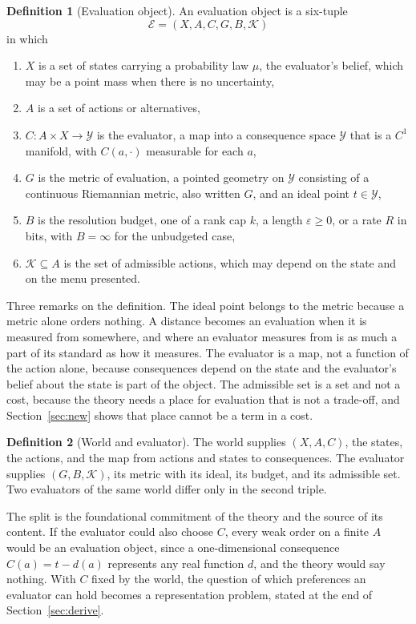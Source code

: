 \documentclass[11pt]{article}
\theoremstyle{definition}
\newtheorem{definition}{Definition}
\theoremstyle{remark}
\newcommand{\Ev}{\mathcal{E}}
\newcommand{\K}{\mathcal{K}}
\newcommand{\Y}{\mathcal{Y}}
\begin{document}
\begin{definition}[Evaluation object]
\label{def:object}
An evaluation object is a six-tuple
\[
\Ev=(X,A,C,G,B,\K)
\]
in which
\begin{enumerate}
\item[(i)] $X$ is a set of states carrying a probability law $\mu$, the evaluator's belief, which may be a point mass when there is no uncertainty,
\item[(ii)] $A$ is a set of actions or alternatives,
\item[(iii)] $C:A\times X\to\Y$ is the evaluator, a map into a consequence space $\Y$ that is a $C^{1}$ manifold, with $C(a,\cdot)$ measurable for each $a$,
\item[(iv)] $G$ is the metric of evaluation, a pointed geometry on $\Y$ consisting of a continuous Riemannian metric, also written $G$, and an ideal point $t\in\Y$,
\item[(v)] $B$ is the resolution budget, one of a rank cap $k$, a length $\varepsilon\ge0$, or a rate $R$ in bits, with $B=\infty$ for the unbudgeted case,
\item[(vi)] $\K\subseteq A$ is the set of admissible actions, which may depend on the state and on the menu presented.
\end{enumerate}
\end{definition}

Three remarks on the definition.
The ideal point belongs to the metric because a metric alone orders nothing.
A distance becomes an evaluation when it is measured from somewhere, and where an evaluator measures from is as much a part of its standard as how it measures.
The evaluator is a map, not a function of the action alone, because consequences depend on the state and the evaluator's belief about the state is part of the object.
The admissible set is a set and not a cost, because the theory needs a place for evaluation that is not a trade-off, and Section~\ref{sec:new} shows that place cannot be a term in a cost.

\begin{definition}[World and evaluator]
\label{def:split}
The world supplies $(X,A,C)$, the states, the actions, and the map from actions and states to consequences.
The evaluator supplies $(G,B,\K)$, its metric with its ideal, its budget, and its admissible set.
Two evaluators of the same world differ only in the second triple.
\end{definition}

The split is the foundational commitment of the theory and the source of its content.
If the evaluator could also choose $C$, every weak order on a finite $A$ would be an evaluation object, since a one-dimensional consequence $C(a)=t-d(a)$ represents any real function $d$, and the theory would say nothing.
With $C$ fixed by the world, the question of which preferences an evaluator can hold becomes a representation problem, stated at the end of Section~\ref{sec:derive}.
\end{document}
